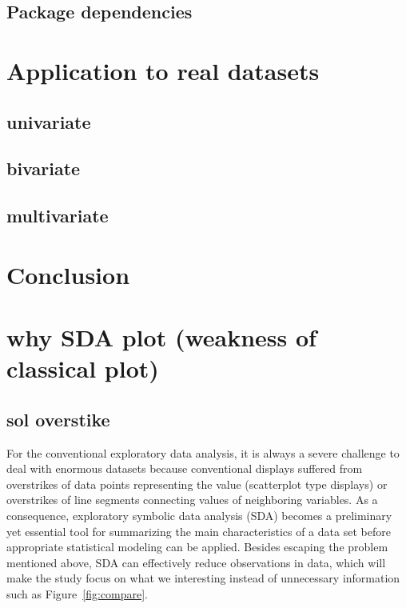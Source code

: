 \documentclass[article]{jss}
\begin{document}
\subsection{Package dependencies}


\section{Application to real datasets}

\subsection{univariate}

\subsection{bivariate}

\subsection{multivariate}


\section{Conclusion}





\section{why SDA plot (weakness of classical plot)}
\subsection{sol overstike}
For the conventional exploratory data analysis, it is always a severe challenge to deal with enormous datasets because conventional displays suffered from overstrikes of data points representing the value (scatterplot type displays) or overstrikes of line segments connecting values of neighboring variables. As a consequence, exploratory symbolic data analysis (SDA) becomes a preliminary yet essential tool for summarizing the main characteristics of a data set before appropriate statistical modeling can be applied. Besides escaping the problem mentioned above, SDA can effectively reduce observations in data, which will make the study focus on what we interesting instead of unnecessary information such as Figure~\ref{fig:compare}.
\end{document}
